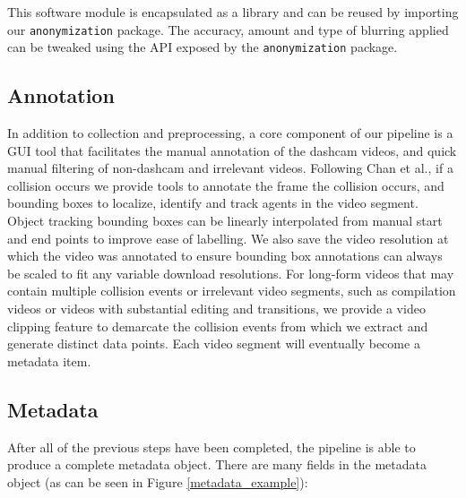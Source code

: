 \documentclass[letterpaper, 10 pt, conference]{IEEEconf}
\begin{document}
This software module is encapsulated as a library and can be reused by importing our \texttt{anonymization} package. The accuracy, amount and type of blurring applied can be tweaked using the API exposed by the \texttt{anonymization} package.

\subsection{Annotation}

In addition to collection and preprocessing, a core component of our pipeline is a GUI tool that facilitates the manual annotation of the dashcam videos, and quick manual filtering of non-dashcam and irrelevant videos. Following Chan et al.\cite{chan2016anticipating}, if a collision occurs we provide tools to annotate the frame the collision occurs, and bounding boxes to localize, identify and track agents in the video segment. Object tracking bounding boxes can be linearly interpolated from manual start and end points to improve ease of labelling. We also save the video resolution at which the video was annotated to ensure bounding box annotations can always be scaled to fit any variable download resolutions. For long-form videos that may contain multiple collision events or irrelevant video segments, such as compilation videos or videos with substantial editing and transitions, we provide a video clipping feature to demarcate the collision events from which we extract and generate distinct data points. 
Each video segment will eventually become a metadata item. 

\subsection{Metadata}
After all of the previous steps have been completed, the pipeline is able to produce a complete metadata object.
There are many fields in the metadata object (as can be seen in Figure \ref{metadata_example}):
\end{document}
